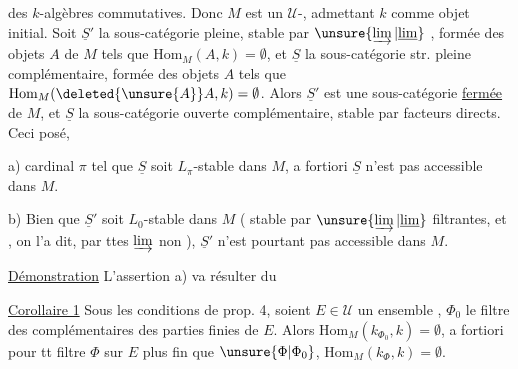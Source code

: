 
des $k$-algèbres commutatives. Donc $M$ est un
$\mathcal U$-, admettant $k$ comme objet initial.
Soit $\underline S'$ la sous-catégorie  pleine,
stable par  $\unsure{\varinjlim|\underline{\lim}}$
, formée des objets $A$ de
$M$ tels que $\mathrm{Hom}_M(A,k)=\emptyset$, et $\underline S$ la
sous-catégorie str. pleine complémentaire, formée des objets $A$ tels
que $\mathrm{Hom}_M(\deleted{\unsure{A}}A,k)=\emptyset$. Alors $\underline S'$ est une
sous-catégorie \uline{fermée} de $M$, et
$\underline S$ la sous-catégorie ouverte complémentaire,
stable par facteurs directs. Ceci posé,

a)  
cardinal $\pi$ tel que $\underline S$ soit $L_{\pi}$-stable dans
$M$, a fortiori $\underline S$ n'est pas accessible dans $M$.

b) Bien que $\underline S'$ soit $L_0$-stable dans $M$
( stable par $\unsure{\varinjlim|\underline{\lim}}$
filtrantes, et \unsure{$=$}, on l'a dit, par ttes $\varinjlim$ non
), $\underline S'$ n'est pourtant pas accessible dans $M$.

\uline{Démonstration}  L'assertion a) va résulter du

\uline{Corollaire 1} Sous les conditions de prop. 4, soient
$E\in\mathcal U$ un ensemble , $\Phi_0$ le filtre des
complémentaires des parties finies de $E$. Alors
 $\mathrm{Hom}_M(k_{\Phi_0},k)=\emptyset$,
a fortiori pour tt filtre $\Phi$ sur $E$ plus fin que
$\unsure{\Phi|\Phi_0}$,  $\mathrm{Hom}_M(k_{\Phi},k)=\emptyset$.
